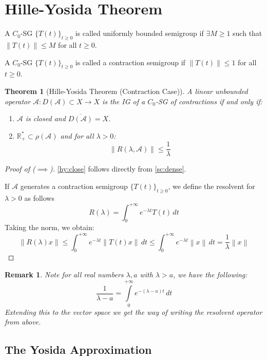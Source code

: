 \documentclass[12pt, oneside]{book}
\newtheorem{remark}{Remark}[section]
\newtheorem{theo}{Theorem}[section]
\newcommand{\norm}[1]{\left\lVert#1\right\rVert}
\newcommand{\A}{\mathscr{A}}
\begin{document}
\section{Hille-Yosida Theorem}

\begin{definition}
A $C_0$-SG $\{T(t)\}_{t \ge 0}$ is called uniformly bounded semigroup if $\exists M \ge 1$ such that $\norm{T(t)} \le M$ for all $t \ge 0$.
\end{definition}

\begin{definition}
A $C_0$-SG $\{T(t)\}_{t \ge 0}$ is called a contraction semigroup if $\norm{T(t)} \le 1$ for all $t \ge 0$.
\end{definition}

\begin{theo}[Hille-Yosida Theorem (Contraction Case)]\label{thm:hy}
A linear unbounded operator $\A: D(\A) \subset X \to X$ is the IG of a $C_0$-SG of contractions if and only if:
\begin{enumerate}[label=(\roman*)]
	\item \label{hy:close} $\A$ is closed and $\overline{D(\A)} = X$.
	\item \label{hy:bound} $\mathbb{R}^*_+ \subset \rho(\A)$ and for all $\lambda > 0$: 
		$$
		\norm{R(\lambda, \A)} \le \frac{1}{\lambda}
		$$
\end{enumerate}
\end{theo}

\begin{proof}[Proof of ($\implies$)]
\ref{hy:close} follows directly from \ref{sc:dense}.

If $\A$ generates a contraction semigroup $\{T(t)\}_{t \ge 0}$, we define the resolvent for $\lambda > 0$ as follows
$$
R(\lambda) = \int_0^{+\infty} e^{-\lambda t} T(t) \, dt
$$
Taking the norm, we obtain:
$$
\norm{R(\lambda)x} \le \int_0^{+\infty} e^{-\lambda t} \norm{T(t)x} \, dt \le \int_0^{+\infty} e^{-\lambda t} \norm{x} \, dt = \frac{1}{\lambda}\norm{x}
$$
\end{proof}

\begin{remark}
Note for all real numbers $\lambda, a$ with $\lambda > a$, we have the following:
$$
\frac{1}{\lambda - a} = \int\limits^{+\infty}_{0} {e^{-(\lambda - a)t} \, dt}
$$
Extending this to the vector space we get the way of writing the resolvent operator from above.
\end{remark}

\subsection{The Yosida Approximation}
\end{document}
